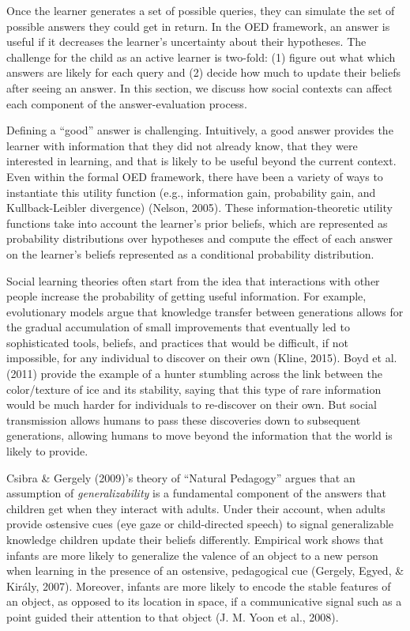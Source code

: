 \documentclass[oneside]{report}
\begin{document}
Once the learner generates a set of possible queries, they can simulate
the set of possible answers they could get in return. In the OED
framework, an answer is useful if it decreases the learner's uncertainty
about their hypotheses. The challenge for the child as an active learner
is two-fold: (1) figure out what which answers are likely for each query
and (2) decide how much to update their beliefs after seeing an answer.
In this section, we discuss how social contexts can affect each
component of the answer-evaluation process.

Defining a ``good'' answer is challenging. Intuitively, a good answer
provides the learner with information that they did not already know,
that they were interested in learning, and that is likely to be useful
beyond the current context. Even within the formal OED framework, there
have been a variety of ways to instantiate this utility function (e.g.,
information gain, probability gain, and Kullback-Leibler divergence)
(Nelson, 2005). These information-theoretic utility functions take into
account the learner's prior beliefs, which are represented as
probability distributions over hypotheses and compute the effect of each
answer on the learner's beliefs represented as a conditional probability
distribution.

Social learning theories often start from the idea that interactions
with other people increase the probability of getting useful
information. For example, evolutionary models argue that knowledge
transfer between generations allows for the gradual accumulation of
small improvements that eventually led to sophisticated tools, beliefs,
and practices that would be difficult, if not impossible, for any
individual to discover on their own (Kline, 2015). Boyd et al. (2011)
provide the example of a hunter stumbling across the link between the
color/texture of ice and its stability, saying that this type of rare
information would be much harder for individuals to re-discover on their
own. But social transmission allows humans to pass these discoveries
down to subsequent generations, allowing humans to move beyond the
information that the world is likely to provide.

Csibra \& Gergely (2009)'s theory of ``Natural Pedagogy'' argues that an
assumption of \emph{generalizability} is a fundamental component of the
answers that children get when they interact with adults. Under their
account, when adults provide ostensive cues (eye gaze or child-directed
speech) to signal generalizable knowledge children update their beliefs
differently. Empirical work shows that infants are more likely to
generalize the valence of an object to a new person when learning in the
presence of an ostensive, pedagogical cue (Gergely, Egyed, \& Király,
2007). Moreover, infants are more likely to encode the stable features
of an object, as opposed to its location in space, if a communicative
signal such as a point guided their attention to that object (J. M. Yoon
et al., 2008).
\end{document}
